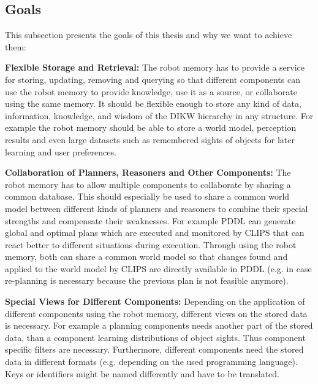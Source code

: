 \documentclass[a4paper,11pt]{article}
\begin{document}
\subsection{Goals}
\label{sec:goals}

This subsection presents the goals of this thesis and why we want to
achieve them:

\smallskip
\textbf{Flexible Storage and Retrieval:} The robot memory has to
provide a service for storing, updating, removing and querying so that
different components can use the robot memory to provide knowledge,
use it as a source, or collaborate using the same memory. It should be
flexible enough to store any kind of data, information, knowledge, and
wisdom of the DIKW hierarchy in any structure. For example the robot
memory should be able to store a world model, perception results and
even large datasets such as remembered sights of objects for later
learning and user preferences.

\smallskip
\textbf{Collaboration of Planners, Reasoners and Other Components:}
The robot memory has to allow multiple components to collaborate by
sharing a common database. This should especially be used to share a
common world model between different kinds of planners and reasoners
to combine their special strengths and compensate their
weaknesses. For example PDDL can generate global and optimal plans
which are executed and monitored by CLIPS that can react better to
different situations during execution. Through using the robot memory,
both can share a common world model so that changes found and applied
to the world model by CLIPS are directly available in PDDL (e.g. in
case re-planning is necessary because the previous plan is not feasible
anymore).

\smallskip
\textbf{Special Views for Different Components:} Depending on the
application of different components using the robot memory, different
views on the stored data is necessary. For example a planning
components needs another part of the stored data, than a component
learning distributions of object sights. Thus component specific
filters are necessary. Furthermore, different components need the
stored data in different formats (e.g. depending on the used
programming language). Keys or identifiers might be named differently
and have to be translated.
\end{document}
